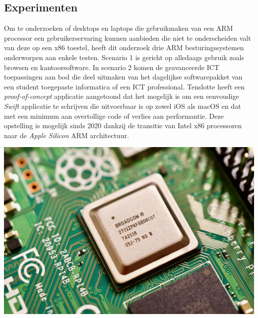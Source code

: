 \documentclass[a0,portrait]{a0poster}
\begin{document}
\begin{multicols}{2}
\section*{Experimenten}
\color{black}
Om te onderzoeken of desktops en laptops die gebruikmaken van een ARM processor een gebruikerservaring kunnen aanbieden die niet te onderscheiden valt van deze op een x86 toestel, heeft dit onderzoek drie ARM besturingssystemen onderworpen aan enkele testen. Scenario 1 is gericht op alledaags gebruik zoals browsen en kantoorsoftware.
In scenario 2 komen de geavanceerde ICT toepassingen aan bod die deel uitmaken van het dagelijkse softwarepakket van een student toegepaste informatica of een ICT professional. Tenslotte heeft een \textit{proof-of-concept} applicatie aangetoond dat het mogelijk is om een eenvoudige \textit{Swift} applicatie te schrijven die uitvoerbaar is op zowel iOS als macOS en dat met een minimum aan overtollige code of verlies aan performantie. Deze opstelling is mogelijk sinds 2020 dankzij de transitie van Intel x86 processoren naar de \textit{Apple Silicon} ARM architectuur.
\begin{center}\vspace{1cm}
	\includegraphics[width=1.0\linewidth]{pi4.jpeg}
\end{center}\vspace{1cm}


\end{multicols}
\end{document}
